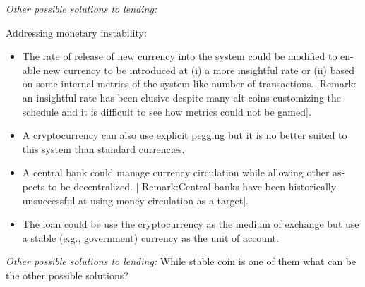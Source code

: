 
\textit{Other possible solutions to lending:} ~

Addressing monetary instability:
\begin{itemize}
	\item The rate of release of new currency into the system could be modified to en-
	able new currency to be introduced at (i) a more insightful rate or (ii) based
	on some internal metrics of the system like number of transactions. [Remark:
	an insightful rate has been elusive despite many alt-coins customizing the
	schedule and it is difficult to see how metrics could not be gamed].
	\item A cryptocurrency can also use explicit pegging but it is no better suited to this system than standard currencies.
	\item A central bank could manage currency circulation while allowing other as-
	pects to be decentralized. [	Remark:Central banks have been historically
	unsuccessful at using money circulation as a target].
	\item The loan could be use the cryptocurrency as the medium of exchange but
	use a stable (e.g.,	government) currency as the unit of account.
\end{itemize}

\textit{Other possible solutions to lending:} While stable coin is one of them what can be the other possible solutions?


